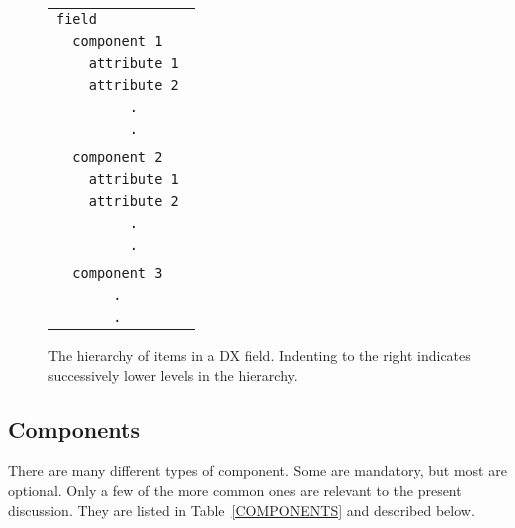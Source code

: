 \begin{figure}[htbp]

\begin{center}

\begin{tabular}{l}
{\tt field     } \\
{\tt ~~component 1   } \\
{\tt ~~~~attribute 1 } \\
{\tt ~~~~attribute 2 } \\
{\tt ~~~~~~~~~.      } \\
{\tt ~~~~~~~~~.      } \\
    \\
{\tt ~~component 2   } \\
{\tt ~~~~attribute 1 } \\
{\tt ~~~~attribute 2 } \\
{\tt ~~~~~~~~~.      } \\
{\tt ~~~~~~~~~.      } \\
   \\
{\tt ~~component 3   } \\
{\tt ~~~~~~~.        } \\
{\tt ~~~~~~~.        } \\
\end{tabular}
\end{center}

\begin{quote}
\caption[The hierarchy of items in a DX field.]{The hierarchy of items in
a DX field. Indenting to the right indicates successively lower levels in
the hierarchy. \label{DXITEMS} }
\end{quote}

\end{figure}

\subsection{Components}

There are many different types of component. Some are mandatory, but
most are optional. Only a few of the more common ones are relevant to
the present discussion. They are listed in Table~\ref{COMPONENTS} and
described below.

